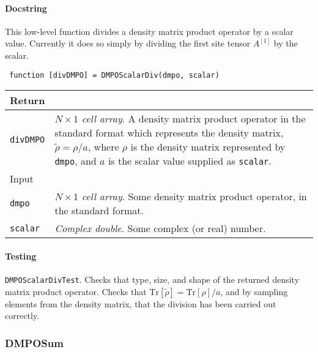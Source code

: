  \paragraph{Docstring} This low-level function divides a density matrix product operator by a scalar value. Currently it does so simply by dividing the first site tensor \(A^{[1]}\) by the scalar.
 \begin{lstlisting}
 function [divDMPO] = DMPOScalarDiv(dmpo, scalar) \end{lstlisting}
 \begin{longtabu}{X[1,l]X[4,l]}
 \hline
 Return & \\ \hline
 \lstinline$divDMPO$ & \emph{\(N \times 1\) cell array}. A density matrix product operator in the standard format which represents the density matrix, \(\tilde{\rho} = \rho / a\), where \(\rho\) is the density matrix represented by \lstinline$dmpo$, and \(a\) is the scalar value supplied as \lstinline$scalar$. \\ \hline
 Input & \\ \hline
 \lstinline$dmpo$ & \emph{\(N \times 1\) cell array}. Some density matrix product operator, in the standard format. \\
 \lstinline$scalar$ & \emph{Complex double}. Some complex (or real) number. \\
 \hline
 \end{longtabu}
 \paragraph{Testing} \lstinline$DMPOScalarDivTest$. Checks that type, size, and shape of the returned density matrix product operator. Checks that \(\mathrm{Tr}[\tilde{\rho}] = \mathrm{Tr}[\rho] / a\), and by sampling elements from the density matrix, that the division has been carried out correctly.

 \subsubsection{DMPOSum}
